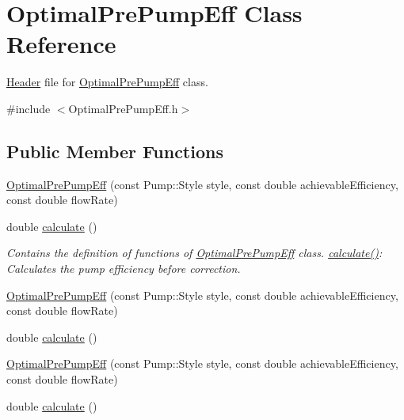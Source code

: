 \hypertarget{class_optimal_pre_pump_eff}{}\section{Optimal\+Pre\+Pump\+Eff Class Reference}
\label{class_optimal_pre_pump_eff}


\hyperlink{class_header}{Header} file for \hyperlink{class_optimal_pre_pump_eff}{Optimal\+Pre\+Pump\+Eff} class.  




{\ttfamily \#include $<$Optimal\+Pre\+Pump\+Eff.\+h$>$}

\subsection*{Public Member Functions}
\begin{DoxyCompactItemize}
\item 
\hyperlink{class_optimal_pre_pump_eff_a7a5c64b8e722f4b8e25c709916392e49}{Optimal\+Pre\+Pump\+Eff} (const Pump\+::\+Style style, const double achievable\+Efficiency, const double flow\+Rate)
\item 
double \hyperlink{class_optimal_pre_pump_eff_a7ced63984a89975c4f8f54642701d841}{calculate} ()
\begin{DoxyCompactList}\small\item\em Contains the definition of functions of \hyperlink{class_optimal_pre_pump_eff}{Optimal\+Pre\+Pump\+Eff} class. \hyperlink{class_optimal_pre_pump_eff_a7ced63984a89975c4f8f54642701d841}{calculate()}\+: Calculates the pump efficiency before correction. \end{DoxyCompactList}\item 
\hyperlink{class_optimal_pre_pump_eff_a7a5c64b8e722f4b8e25c709916392e49}{Optimal\+Pre\+Pump\+Eff} (const Pump\+::\+Style style, const double achievable\+Efficiency, const double flow\+Rate)
\item 
double \hyperlink{class_optimal_pre_pump_eff_a7ced63984a89975c4f8f54642701d841}{calculate} ()
\item 
\hyperlink{class_optimal_pre_pump_eff_a7a5c64b8e722f4b8e25c709916392e49}{Optimal\+Pre\+Pump\+Eff} (const Pump\+::\+Style style, const double achievable\+Efficiency, const double flow\+Rate)
\item 
double \hyperlink{class_optimal_pre_pump_eff_a7ced63984a89975c4f8f54642701d841}{calculate} ()
\end{DoxyCompactItemize}


